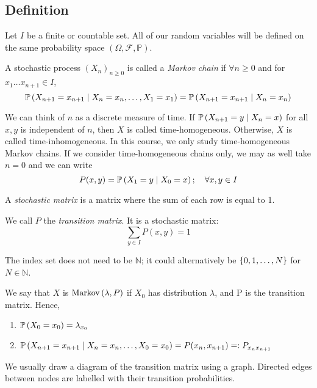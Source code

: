 \subsection{Definition}
Let \( I \) be a finite or countable set.
All of our random variables will be defined on the same probability space \( (\Omega, \mathcal F, \mathbb P) \).
\begin{definition}
	A stochastic process \( (X_n)_{n \geq 0} \) is called a \textit{Markov chain} if \( \forall n \geq 0 \) and for \( x_1 \dots x_{n+1} \in I \),
	\[
		\mathbb{P}\left({X_{n+1} = x_{n+1} \mid X_n = x_n, \dots,X_1 = x_1}\right) = \mathbb{P}\left({X_{n+1} = x_{n+1} \mid X_n = x_n}\right)
	\]
\end{definition}
We can think of \( n \) as a discrete measure of time.
If \( \mathbb{P}\left({X_{n+1} = y \mid X_n = x}\right) \) for all \( x, y \) is independent of \( n \), then \( X \) is called time-homogeneous.
Otherwise, \( X \) is called time-inhomogeneous.
In this course, we only study time-homogeneous Markov chains.
If we consider time-homogeneous chains only, we may as well take \( n = 0 \) and we can write
\[
	P(x,y) = \mathbb{P}\left({X_1 = y \mid X_0 = x}\right);\quad \forall x,y \in I
\]
\begin{definition}
	A \textit{stochastic matrix} is a matrix where the sum of each row is equal to 1.
\end{definition}
We call \( P \) the \textit{transition matrix}.
It is a stochastic matrix:
\[
	\sum_{y \in I} P(x,y) = 1
\]
\begin{remark}
	The index set does not need to be \( \mathbb N \); it could alternatively be \( \qty{0,1,\dots,N} \) for \( N \in \mathbb N \).
\end{remark}
We say that \( X \) is \(\operatorname{Markov}\left({\lambda, P}\right)\) if \( X_0 \) has distribution \(\lambda\), and P is the transition matrix.
Hence,
\begin{enumerate}
	\item \( \mathbb{P}\left({X_0 = x_0}\right) = \lambda_{x_0} \)
	\item \( \mathbb{P}\left({X_{n+1} = x_{n+1} \mid X_n = x_n, \dots, X_0 = x_0}\right) = P(x_n, x_{n+1}) =: P_{x_n x_{n+1}} \)
\end{enumerate}
We usually draw a diagram of the transition matrix using a graph.
Directed edges between nodes are labelled with their transition probabilities.

